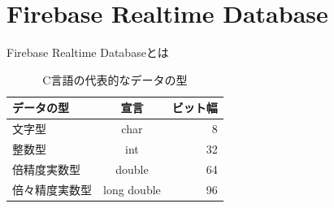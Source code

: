 \section{Firebase Realtime Database}
\label{sec:reference_realtime}
Firebase Realtime Databaseとは

\begin{table}[hbtp]
  \caption{C言語の代表的なデータの型}
  \label{table:data_type}
  \centering
  \begin{tabular}{lcr}
    \hline
    データの型  & 宣言  &  ビット幅  \\
    \hline \hline
    文字型  & char  & 8 \\
    整数型  & int   & 32 \\
    倍精度実数型  & double  & 64 \\
    倍々精度実数型  &  long double  &  96 \\
    \hline
  \end{tabular}
\end{table}